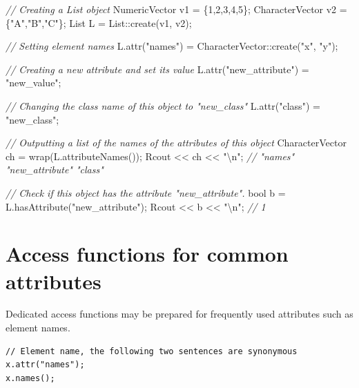 \documentclass[]{book}
\newenvironment{Shaded}{\begin{snugshade}}{\end{snugshade}}
\newcommand{\CommentTok}[1]{\textcolor[rgb]{0.56,0.35,0.01}{\textit{#1}}}
\newcommand{\DataTypeTok}[1]{\textcolor[rgb]{0.13,0.29,0.53}{#1}}
\newcommand{\DecValTok}[1]{\textcolor[rgb]{0.00,0.00,0.81}{#1}}
\newcommand{\NormalTok}[1]{#1}
\newcommand{\SpecialCharTok}[1]{\textcolor[rgb]{0.00,0.00,0.00}{#1}}
\newcommand{\StringTok}[1]{\textcolor[rgb]{0.31,0.60,0.02}{#1}}
\begin{document}
\begin{Shaded}
\begin{Highlighting}[]
\CommentTok{// Creating a List object}
\NormalTok{NumericVector   v1 = \{}\DecValTok{1}\NormalTok{,}\DecValTok{2}\NormalTok{,}\DecValTok{3}\NormalTok{,}\DecValTok{4}\NormalTok{,}\DecValTok{5}\NormalTok{\};}
\NormalTok{CharacterVector v2 = \{}\StringTok{"A"}\NormalTok{,}\StringTok{"B"}\NormalTok{,}\StringTok{"C"}\NormalTok{\};}
\NormalTok{List L = List::create(v1, v2);}

\CommentTok{// Setting element names}
\NormalTok{L.attr(}\StringTok{"names"}\NormalTok{) = CharacterVector::create(}\StringTok{"x"}\NormalTok{, }\StringTok{"y"}\NormalTok{);}

\CommentTok{// Creating a new attribute and set its value}
\NormalTok{L.attr(}\StringTok{"new_attribute"}\NormalTok{) = }\StringTok{"new_value"}\NormalTok{;}

\CommentTok{// Changing the class name of this object to "new_class"}
\NormalTok{L.attr(}\StringTok{"class"}\NormalTok{) = }\StringTok{"new_class"}\NormalTok{;}

\CommentTok{// Outputting a list of the names of the attributes of this object}
\NormalTok{CharacterVector ch = wrap(L.attributeNames());}
\NormalTok{Rcout << ch << }\StringTok{"}\SpecialCharTok{\textbackslash{}n}\StringTok{"}\NormalTok{; }\CommentTok{// "names" "new_attribute" "class"}

\CommentTok{// Check if this object has the attribute "new_attribute".}
\DataTypeTok{bool}\NormalTok{ b = L.hasAttribute(}\StringTok{"new_attribute"}\NormalTok{);}
\NormalTok{Rcout << b << }\StringTok{"}\SpecialCharTok{\textbackslash{}n}\StringTok{"}\NormalTok{; }\CommentTok{// 1}
\end{Highlighting}
\end{Shaded}

\hypertarget{access-functions-for-common-attributes}{%
\section{Access functions for common attributes}\label{access-functions-for-common-attributes}}

Dedicated access functions may be prepared for frequently used attributes such as element names.

\begin{verbatim}
// Element name, the following two sentences are synonymous
x.attr("names");
x.names();
\end{verbatim}
\end{document}
